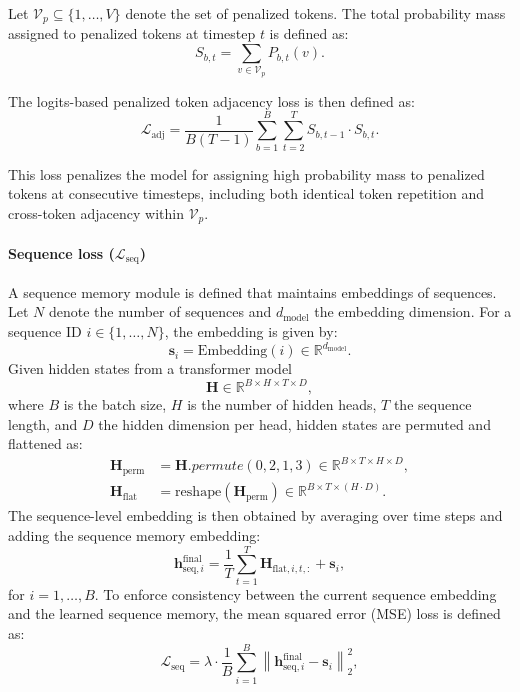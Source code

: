 \documentclass{article} %
\begin{document}
Let $\mathcal{V}_p \subseteq \{1,\dots,V\}$ denote the set of penalized tokens.
The total probability mass assigned to penalized tokens at timestep $t$ is defined as:
\begin{equation}
S_{b,t}
=
\sum_{v \in \mathcal{V}_p} P_{b,t}(v) .
\end{equation}

The logits-based penalized token adjacency loss is then defined as:
\begin{equation}
\mathcal{L}_{\text{adj}}
=
\frac{1}{B(T-1)}
\sum_{b=1}^{B}
\sum_{t=2}^{T}
S_{b,t-1} \cdot S_{b,t} .
\end{equation}

This loss penalizes the model for assigning high probability mass to penalized tokens
at consecutive timesteps, including both identical token repetition and cross-token
adjacency within $\mathcal{V}_p$.

\paragraph{Sequence loss ($\mathcal{L}_{\text{seq}}$)} 
A sequence memory module is defined that maintains embeddings of sequences. 
Let $N$ denote the number of sequences and $d_{\text{model}}$ the 
embedding dimension. For a sequence ID $i \in \{1, \dots, N\}$, 
the embedding is given by:
\begin{equation}
\mathbf{s}_i = \mathrm{Embedding}(i) \in \mathbb{R}^{d_{\text{model}}}.
\end{equation}
Given hidden states from a transformer model
\[
\mathbf{H} \in \mathbb{R}^{B \times H \times T \times D},
\]
where $B$ is the batch size, $H$ is the number of hidden heads, $T$ the sequence length, and $D$ the hidden dimension per head, hidden states are permuted and flattened as:
\begin{align}
\mathbf{H}_{\text{perm}} &= \mathbf{H}.permute(0, 2, 1, 3) \in \mathbb{R}^{B \times T \times H \times D},\\
\mathbf{H}_{\text{flat}} &= \mathrm{reshape}(\mathbf{H}_{\text{perm}}) \in \mathbb{R}^{B \times T \times (H \cdot D)}.
\end{align}
The sequence-level embedding is then obtained by averaging over time steps and adding the sequence memory embedding:
\begin{equation}
\mathbf{h}_{\text{seq}, i}^{\text{final}} = \frac{1}{T} \sum_{t=1}^{T} \mathbf{H}_{\text{flat}, i, t, :} + \mathbf{s}_i,
\end{equation}
for $i = 1, \dots, B$.
To enforce consistency between the current sequence embedding 
and the learned sequence memory, the mean squared error (MSE) loss is defined as:
\begin{equation}
\mathcal{L}_{\text{seq}} = \lambda \cdot \frac{1}{B} \sum_{i=1}^{B} \left\| \mathbf{h}_{\text{seq}, i}^{\text{final}} - \mathbf{s}_i \right\|_2^2,
\end{equation}
\end{document}
